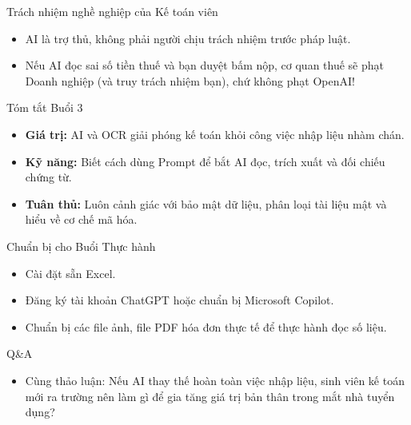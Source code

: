 \documentclass[aspectratio=169]{beamer}
\begin{document}
\begin{frame}{Trách nhiệm nghề nghiệp của Kế toán viên}
    \begin{itemize}
        \item AI là trợ thủ, không phải người chịu trách nhiệm trước pháp luật.
        \item Nếu AI đọc sai số tiền thuế và bạn duyệt bấm nộp, cơ quan thuế sẽ phạt Doanh nghiệp (và truy trách nhiệm bạn), chứ không phạt OpenAI!
    \end{itemize}
\end{frame}


\begin{frame}{Tóm tắt Buổi 3}
    \begin{itemize}
        \item \textbf{Giá trị:} AI và OCR giải phóng kế toán khỏi công việc nhập liệu nhàm chán.
        \item \textbf{Kỹ năng:} Biết cách dùng Prompt để bắt AI đọc, trích xuất và đối chiếu chứng từ.
        \item \textbf{Tuân thủ:} Luôn cảnh giác với bảo mật dữ liệu, phân loại tài liệu mật và hiểu về cơ chế mã hóa.
    \end{itemize}
\end{frame}


\begin{frame}{Chuẩn bị cho Buổi Thực hành}
    \begin{itemize}
        \item Cài đặt sẵn Excel.
        \item Đăng ký tài khoản ChatGPT hoặc chuẩn bị Microsoft Copilot.
        \item Chuẩn bị các file ảnh, file PDF hóa đơn thực tế để thực hành đọc số liệu.
    \end{itemize}
\end{frame}


\begin{frame}{Q\&A}
    \begin{itemize}
        \item Cùng thảo luận: Nếu AI thay thế hoàn toàn việc nhập liệu, sinh viên kế toán mới ra trường nên làm gì để gia tăng giá trị bản thân trong mắt nhà tuyển dụng?
    \end{itemize}
\end{frame}
\end{document}
